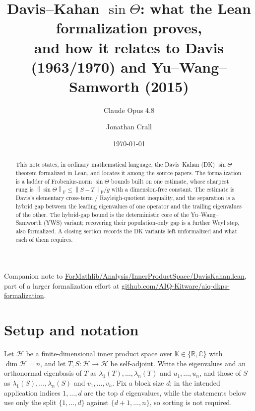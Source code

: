 \documentclass[11pt]{article}
\title{Davis--Kahan $\sin\Theta$: what the Lean formalization proves,\\
and how it relates to Davis (1963/1970) and Yu--Wang--Samworth (2015)}
\author{Claude Opus 4.8 \and Jonathan Crall}
\date{\today}
\newcommand{\norm}[1]{\left\lVert #1\right\rVert}
\newcommand{\F}{\mathrm{F}}
\newcommand{\gap}{g}
\newcommand{\HH}{\mathcal H}
\newcommand{\sinT}{\sin\Theta}
\theoremstyle{remark}
\begin{document}
\maketitle

\begin{abstract}
This note states, in ordinary mathematical language, the Davis--Kahan (DK)
$\sin\Theta$ theorem formalized in Lean, and locates it among the source papers.
The formalization is a ladder of Frobenius-norm $\sin\Theta$ bounds built on one
estimate, whose sharpest rung is $\norm{\sinT}_{\F}\le\norm{S-T}_{\F}/\gap$ with a
dimension-free constant.  The estimate is Davis's elementary cross-term /
Rayleigh-quotient inequality, and the separation is a hybrid gap between the
leading eigenvalues of one operator and the trailing eigenvalues of the other.
The hybrid-gap bound is the deterministic core of the Yu--Wang--Samworth (YWS)
variant; recovering their population-only gap is a further Weyl step, also
formalized.  A closing section records the DK variants left unformalized and what
each of them requires.
\end{abstract}

\vspace{1.5em}
\noindent Companion note to \href{https://github.com/AIQ-Kitware/aiq-dkps-formalization/blob/375251df7ab712397977635e8f607c11c3a8083d/ForMathlib/Analysis/InnerProductSpace/DavisKahan.lean}{ForMathlib/Analysis/InnerProductSpace/DavisKahan.lean}, part of a larger formalization effort at \href{https://github.com/AIQ-Kitware/aiq-dkps-formalization}{github.com/AIQ-Kitware/aiq-dkps-formalization}.

\section{Setup and notation}

Let $\HH$ be a finite-dimensional inner product space over
$\mathbb K\in\{\mathbb R,\mathbb C\}$ with $\dim\HH=n$, and let $T,S:\HH\to\HH$ be
self-adjoint.  Write the eigenvalues and an orthonormal eigenbasis of $T$ as
$\lambda_1(T),\dots,\lambda_n(T)$ and $u_1,\dots,u_n$, and those of $S$ as
$\lambda_1(S),\dots,\lambda_n(S)$ and $v_1,\dots,v_n$.  Fix a block size $d$; in
the intended application indices $1,\dots,d$ are the top $d$ eigenvalues, while
the statements below use only the split $\{1,\dots,d\}$ against
$\{d+1,\dots,n\}$, so sorting is not required.
\end{document}
